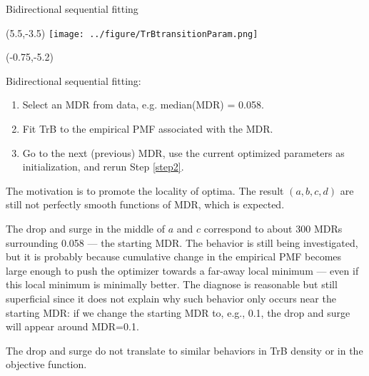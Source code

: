 \documentclass[aspectratio=169]{beamer}
\begin{document}
\begin{frame}{Bidirectional sequential fitting}
\begin{textblock}{1}(5.5,-3.5)
\texttt{[image: ../figure/TrBtransitionParam.png]}
\end{textblock}


\begin{textblock}{5.5}(-0.75,-5.2)

\tiny Bidirectional sequential fitting:\medskip

\begin{enumerate}
\tiny\item Select an MDR from data, e.g. median(MDR) = 0.058.\medskip

\tiny\item\label{step2} Fit TrB to the empirical PMF associated with the MDR.\medskip

\tiny\item Go to the next (previous) MDR, use the current optimized parameters as initialization, and rerun Step \ref{step2}.\smallskip

\end{enumerate}

The motivation is to promote the locality of optima. The result $(a,b,c,d)$ are still not perfectly smooth functions of MDR, which is expected.\medskip\pause

The drop and surge in the middle of $a$ and $c$ correspond to about 300 MDRs surrounding 0.058 --- the starting MDR. The behavior is still being investigated, but it is probably because cumulative change in the empirical PMF becomes large enough to push the optimizer towards a far-away local minimum --- even if this local minimum is minimally better. The diagnose is reasonable but still superficial since it does not explain why such behavior only occurs near the starting MDR: if we change the starting MDR to, e.g., 0.1, the drop and surge will appear around MDR=0.1.\medskip

The drop and surge do not translate to similar behaviors in TrB density or in the objective function. 

\end{textblock}

\end{frame}
\end{document}
